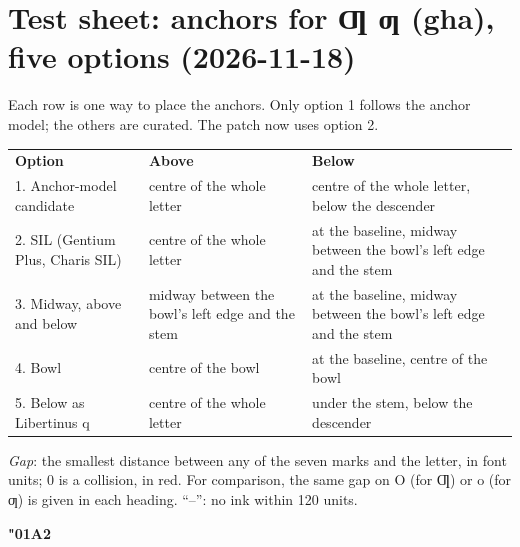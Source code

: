 \documentclass[10pt]{article}
\begin{document}
\section*{Test sheet: anchors for Ƣ ƣ (gha), five options (2026-11-18)}
Each row is one way to place the anchors. Only option 1 follows the anchor model; the others are curated. The patch now uses option 2.\par\smallskip
\begin{tabular}{@{}l l l@{}}\textbf{Option} & \textbf{Above} & \textbf{Below} \\
1. Anchor-model candidate & centre of the whole letter & centre of the whole letter, below the descender \\
2. SIL (Gentium Plus, Charis SIL) & centre of the whole letter & at the baseline, midway between the bowl's left edge and the stem \\
3. Midway, above and below & midway between the bowl's left edge and the stem & at the baseline, midway between the bowl's left edge and the stem \\
4. Bowl & centre of the bowl & at the baseline, centre of the bowl \\
5. Below as Libertinus q & centre of the whole letter & under the stem, below the descender \\
\end{tabular}\par\smallskip
\emph{Gap}: the smallest distance between any of the seven marks and the letter, in font units; 0 is a collision, in {\color{warn}red}.
For comparison, the same gap on O (for Ƣ) or o (for ƣ) is given in each heading. ``--'': no ink within 120 units.
\par{}\par
\par\medskip\textbf{\char"01A2}\par
\end{document}
